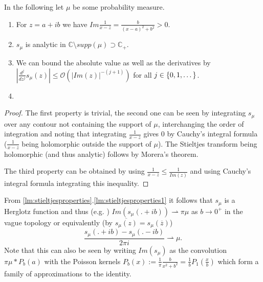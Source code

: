 \begin{lemma}\label{lm:stieltjesproperties}
In the following let $\mu$ be some probability measure.
	\begin{enumerate}
		\item For $z=a+ib$ we have $Im\frac{1}{x-z}=\frac{b}{(x-a)^2+b^2}>0$.\label{lm:stieltjesproperties1}
		\item $s_\mu$ is analytic in $\mathbb C\setminus supp(\mu)\supset\mathbb C_+$.\label{lm:stieltjesproperties2}
		\item We can bound the absolute value as well as the derivatives by $|\frac{d^j}{dz^j}s_\mu(z)|\leq \mathcal O(|Im(z)|^{-(j+1)})$ for all $j\in\mathbb \{0,1,\dots\}$.\label{lm:stieltjesproperties3}
		\item 
	\end{enumerate}
\end{lemma}

\begin{proof}
	The first property is trivial, the second one can be seen by integrating $s_\mu$ over any contour not containing the support of $\mu$, interchanging the order of integration and noting that integrating $\frac{1}{x-z}$ gives $0$ by Cauchy's integral formula ($\frac{1}{x-z}$ being holomorphic outside the support of $\mu$). The Stieltjes transform being holomorphic (and thus analytic) follows by Morera's theorem.
	
	The third property can be obtained by using $\frac{1}{x-z}\leq \frac{1}{Im(z)}$ and using Cauchy's integral formula integrating this inequality.
\end{proof}

\begin{corollary}
	From \ref{lm:stieltjesproperties}.\ref{lm:stieltjesproperties1} it follows that $s_\mu$ is a Herglotz function and thus (e.g. \cite{TeschlQM}) $Im(s_\mu(.+ib))\rightharpoonup\pi\mu$ as $b\rightarrow 0^+$ in the vague topology or equivalently (by $\overline{s_\mu(z)}=s_\mu(\overline z)$)
	\begin{equation}
		\frac{s_\mu(.+ib)-s_\mu(.-ib)}{2\pi i}\rightharpoonup\mu.
	\end{equation}
	Note that this can also be seen by writing $Im(s_\mu)$ as the convolution $\pi\mu * P_b(a)$ with the Poisson kernels $P_b(x):=\frac{1}{\pi}\frac{b}{x^2+b^2} = \frac{1}{b}P_1(\frac{x}{b})$ which form a family of approximations to the identity.
\end{corollary}

